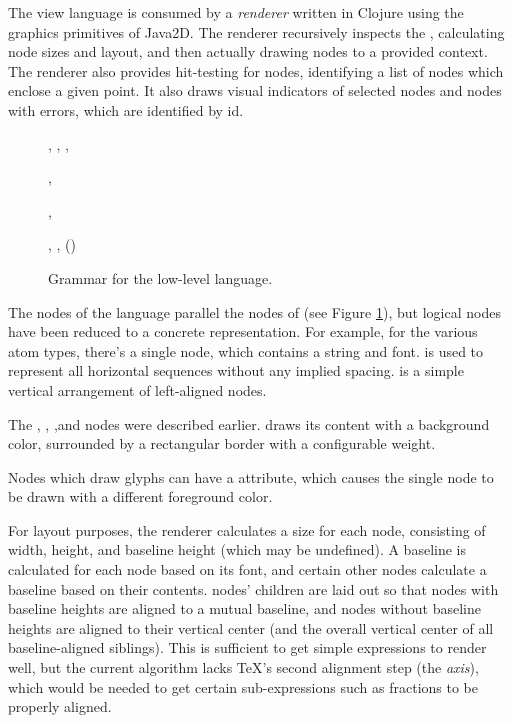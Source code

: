 The view language is consumed by a \emph{renderer} written in Clojure using the graphics primitives of Java2D\cite{java2d}. The renderer recursively inspects the , calculating node sizes and layout, and then actually drawing nodes to a provided context.
The renderer also provides hit-testing for nodes, identifying a list of  nodes which enclose a given point. It also draws visual indicators of selected nodes and nodes with errors, which are identified by id.

\begin{figure}


, , , 

, 


, 



, , ()

\caption{\label{fig-view} Grammar for the low-level  language.}
\end{figure}

The nodes of the  language parallel the nodes of  (see Figure \ref{fig-view}), but logical nodes have been reduced to a concrete representation. For example, for the various atom types, there's a single  node, which contains a string and font.  is used to represent all horizontal sequences without any implied spacing.  is a simple vertical arrangement of left-aligned nodes.

The , , ,and  nodes were described earlier.  draws its content with a background color, surrounded by a rectangular border with a configurable weight.

Nodes which draw glyphs can have a  attribute, which causes the single node to be drawn with a different foreground color.

For layout purposes, the renderer calculates a size for each node, consisting of width, height, and baseline height (which may be undefined). A baseline is calculated for each  node based on its font, and certain other nodes calculate a baseline based on their contents.  nodes' children are laid out so that nodes with baseline heights are aligned to a mutual baseline, and nodes without baseline heights are aligned to their vertical center (and the overall vertical center of all baseline-aligned siblings). This is sufficient to get simple expressions to render well, but the current algorithm lacks \TeX's second alignment step (the \emph{axis}), which would be needed to get certain sub-expressions such as fractions to be properly aligned.
 
